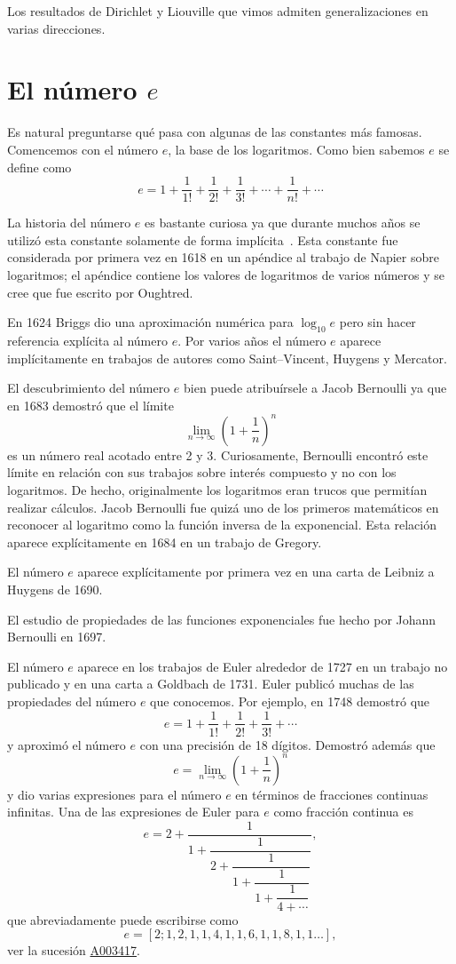 Los resultados de Dirichlet y Liouville que vimos admiten generalizaciones en
varias direcciones. 


\section*{El número $e$}

Es natural preguntarse qué pasa con algunas de las constantes más famosas.
Comencemos con el número $e$, la base de los logaritmos.  Como bien sabemos $e$
se define como
\[
	e=1+\frac{1}{1!}+\frac{1}{2!}+\frac{1}{3!}+\cdots+\frac{1}{n!}+\cdots
\]

La historia del número $e$ es bastante curiosa ya que durante muchos años se
utilizó esta constante solamente de forma implícita~\cite{MR38289}. Esta constante fue
considerada por primera vez en 1618 en un apéndice al trabajo de Napier 
sobre logaritmos; el apéndice contiene los valores de logaritmos de varios
números y se cree que fue escrito por Oughtred. 

En 1624 Briggs dio una
aproximación numérica para $\log_{10}e$ pero sin hacer referencia explícita al
número $e$. Por varios años el número $e$ aparece implícitamente en trabajos de
autores como Saint--Vincent, Huygens y Mercator.  

El descubrimiento del número
$e$ bien puede atribuírsele a Jacob Bernoulli ya que en 1683 demostró que el
límite 
\[
	\lim_{n\to\infty}\left(1+\frac1n\right)^n
\]
es un número real acotado entre 2 y 3. Curiosamente, Bernoulli encontró este
límite en relación con sus trabajos sobre interés compuesto y no con los
logaritmos. De hecho, originalmente los logaritmos eran trucos que permitían
realizar cálculos. Jacob Bernoulli fue quizá uno de los primeros matemáticos en
reconocer al logaritmo como la función inversa de la exponencial. Esta relación
aparece explícitamente en 1684 en un trabajo de Gregory.

El número $e$ aparece explícitamente por primera vez en una carta de Leibniz a
Huygens de 1690. 

El estudio de propiedades de las funciones exponenciales fue
hecho por Johann Bernoulli en 1697. 

El número $e$ aparece en los trabajos de Euler 
alrededor de 1727 en un trabajo no publicado y 
en una carta a Goldbach de 1731. Euler publicó muchas de las propiedades del
número $e$ que conocemos. Por ejemplo, en 1748 demostró que 
\[
	e=1+\frac{1}{1!}+\frac{1}{2!}+\frac{1}{3!}+\cdots
\]
y aproximó el número $e$ con una precisión de 18 dígitos. Demostró además que 
\[
	e=\lim_{n\to\infty}\left(1+\frac1n\right)^n
\]
y dio varias expresiones para el número $e$ en términos de fracciones continuas
infinitas. Una de las expresiones de Euler para $e$ como fracción continua es 
\[
	e=2+\dfrac{1}{1+\dfrac{1}{2+\dfrac{1}{1+\dfrac{1}{1+\dfrac{1}{4+\cdots}}}}},
\]
que abreviadamente puede escribirse como
\[
	e = [2;1,2,1,1,4,1,1,6,1,1,8,1,1\dots],
\]
ver la sucesión \href{https://oeis.org/A003417}{A003417}.

